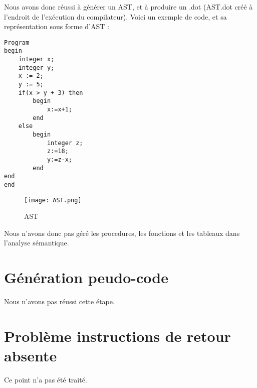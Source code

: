 \documentclass{report}
\begin{document}
\newpage

Nous avons donc réussi à générer un AST, et à produire un .dot (AST.dot créé à l'endroit de l'exécution du compilateur). Voici un exemple de code, et sa représentation sous forme d'AST : 

\begin{verbatim}
Program
begin
	integer x;
	integer y;
	x := 2;
	y := 5;
	if(x > y + 3) then
		begin
			x:=x+1;
		end
	else
		begin
			integer z;
			z:=18;
			y:=z-x;
		end
end
end
\end{verbatim}

\begin{figure}[h!]
	\begin{center}
		\texttt{[image: AST.png]}
		\caption{AST}
	\end{center}
\end{figure}


Nous n'avons donc pas géré les procedures, les fonctions et les tableaux dans l'analyse sémantique.

\newpage

\section*{Génération peudo-code}

Nous n'avons pas réussi cette étape.

\section*{Problème instructions de retour absente}

Ce point n'a pas été traité.
\end{document}

